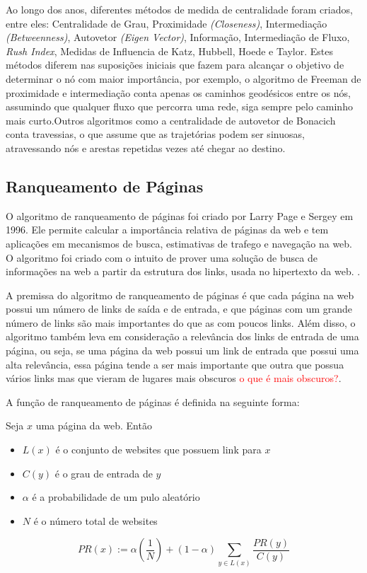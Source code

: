 Ao longo dos anos, diferentes métodos de medida de centralidade foram criados, entre eles: Centralidade de Grau, Proximidade \textit{(Closeness)}, Intermediação \textit{(Betweenness)}, Autovetor \textit{(Eigen Vector)}, Informação, Intermediação de Fluxo, \textit{Rush Index}, Medidas de Influencia de Katz, Hubbell, Hoede e Taylor. Estes métodos diferem nas suposições iniciais que fazem para alcançar o objetivo de determinar o nó com maior importância, por exemplo, o algoritmo de Freeman de proximidade e intermediação conta apenas os caminhos geodésicos entre os nós, assumindo que qualquer fluxo que percorra uma rede, siga sempre pelo caminho mais curto.Outros algoritmos como a centralidade de autovetor de Bonacich conta travessias, o que assume que as trajetórias podem ser sinuosas, atravessando nós e arestas repetidas vezes até chegar ao destino\cite{centrality}.

\subsection{Ranqueamento de Páginas}
\label{ref:ran:pag}
O algoritmo de ranqueamento de páginas foi criado por Larry Page e Sergey em 1996. Ele permite calcular a importância relativa de páginas da web e tem aplicações em mecanismos de busca, estimativas de trafego e navegação na web. O algoritmo foi criado com o intuito de prover uma solução de busca de informações na web a partir da estrutura dos links, usada no hipertexto da web. \cite{pageRank}.

A premissa do algoritmo de ranqueamento de páginas é que cada página na web possui um número de links de saída e de entrada, e que páginas com um grande número de links são mais importantes do que as com poucos links. Além disso, o algoritmo também leva em consideração a relevância dos links de entrada de uma página, ou seja, se uma página da web possui um link de entrada que possui uma alta relevância, essa página tende a ser mais importante que outra que possua vários links mas que vieram de lugares mais obscuros \textcolor{red}{o que é mais obscuros?}.

A função de ranqueamento de páginas é definida na seguinte forma:

Seja $x$ uma página da web. Então
\begin{itemize}
    \item $L(x)$ é o conjunto de websites que possuem link para $x$
    \item $C(y)$ é o grau de entrada de $y$
    \item $\alpha$ é a probabilidade de um pulo aleatório
    \item $N$ é o número total de websites
\end{itemize}
\[\displaystyle PR(x) := \alpha \left ( \frac{1}{N} \right ) + (1-\alpha) \sum_{y\in L(x)} \frac{PR(y)}{C(y)}\]

